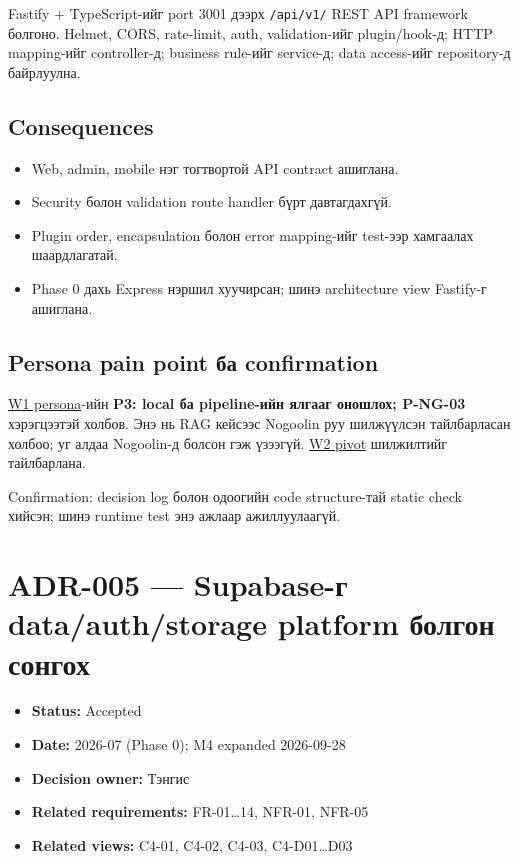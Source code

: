 \documentclass[
  mongolian,
]{article}
\providecommand{\tightlist}{%
  \setlength{\itemsep}{0pt}\setlength{\parskip}{0pt}}
\begin{document}
Fastify + TypeScript-ийг port 3001 дээрх \texttt{/api/v1/} REST API
framework болгоно. Helmet, CORS, rate-limit, auth, validation-ийг
plugin/hook-д; HTTP mapping-ийг controller-д; business rule-ийг
service-д; data access-ийг repository-д байрлуулна.

\subsection{Consequences}\label{consequences}

\begin{itemize}
\tightlist
\item
  Web, admin, mobile нэг тогтвортой API contract ашиглана.
\item
  Security болон validation route handler бүрт давтагдахгүй.
\item
  Plugin order, encapsulation болон error mapping-ийг test-ээр хамгаалах
  шаардлагатай.
\item
  Phase 0 дахь Express нэршил хуучирсан; шинэ architecture view
  Fastify-г ашиглана.
\end{itemize}

\subsection{Persona pain point ба
confirmation}\label{persona-pain-point-ux431ux430-confirmation}

\href{https://github.com/Tengis01/Nogoolin/blob/main/docs/ICSI438/sem1/wiki/02_audience_persona.md}{W1
persona}-ийн \textbf{P3: local ба pipeline-ийн ялгааг оношлох; P-NG-03}
хэрэгцээтэй холбов. Энэ нь RAG кейсээс Nogoolin руу шилжүүлсэн
тайлбарласан холбоо; уг алдаа Nogoolin-д болсон гэж үзээгүй.
\href{https://github.com/Tengis01/Nogoolin/blob/main/docs/ICSI438/sem2/wiki/persona-and-pivot.md}{W2
pivot} шилжилтийг тайлбарлана.

Confirmation: decision log болон одоогийн code structure-тай static
check хийсэн; шинэ runtime test энэ ажлаар ажиллуулаагүй.

\newpage

\section{ADR-005 --- Supabase-г data/auth/storage platform болгон
сонгох}\label{adr-005-supabase-ux433-dataauthstorage-platform-ux431ux43eux43bux433ux43eux43d-ux441ux43eux43dux433ux43eux445}

\begin{itemize}
\tightlist
\item
  \textbf{Status:} Accepted
\item
  \textbf{Date:} 2026-07 (Phase 0); M4 expanded 2026-09-28
\item
  \textbf{Decision owner:} Тэнгис
\item
  \textbf{Related requirements:} FR-01\ldots14, NFR-01, NFR-05
\item
  \textbf{Related views:} C4-01, C4-02, C4-03, C4-D01\ldots D03
\end{itemize}
\end{document}
